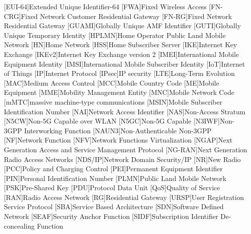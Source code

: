 \begin{multicols}{2}
\begin{acronym}[AAAAAA]
        [EUI-64]{Extended Unique Identifier-64}
        [FWA]{Fixed Wireless Access}
        [FN-CRG]{Fixed Network Customer Residential Gateway}
        [FN-RG]{Fixed Network Residential Gateway}
        [GUAMI]{Globally Unique AMF Identifier}
        [GUTI]{Globally Unique Temporary Identity}
        [HPLMN]{Home Operator Public Land Mobile Network}
        [HN]{Home Network}
        [HSS]{Home Subscriber Server}
        [IKE]{Internet Key Exchange}
        [IKEv2]{Internet Key Exchange version 2}
        [IMEI]{International Mobile Equipment Identity}
        [IMSI]{International Mobile Subscriber Identity}
        [IoT]{Internet of Things}
        [IP]{Internet Protocol}
        [IPsec]{IP security}
        [LTE]{Long-Term Evolution}
        [MAC]{Medium Access Control}
        [MCC]{Mobile Country Code}
        [ME]{Mobile Equipment}
        [MME]{Mobility Management Entity}
        [MNC]{Mobile Network Code}
        [mMTC]{massive machine-type communications}
        [MSIN]{Mobile Subscriber Identification Number}
        [NAI]{Network Access Identifier}
        [NAS]{Non-Access Stratum}
        [N5CW]{Non-5G Capable over WLAN}
        [N5GC]{Non-5G Capable}
        [N3IWF]{Non-3GPP Interworking Function}
        [NAUN3]{Non-Authenticable Non-3GPP}
        [NF]{Network Function}
        [NFV]{Network Functions Virtualization}
        [NGAP]{Next Generation Access and Service Management Protocol}
        [NG-RAN]{Next Generation Radio Access Networks}
        [NDS/IP]{Network Domain Security/IP}
        [NR]{New Radio}
        [PCC]{Policy and Charging Control}
        [PEI]{Permanent Equipment Identifier}
        [PIN]{Personal Identification Number}
        [PLMN]{Public Land Mobile Network}
        [PSK]{Pre-Shared Key}
        [PDU]{Protocol Data Unit}
        [QoS]{Quality of Service}
        [RAN]{Radio Access Network}
        [RG]{Residential Gateway}
        [URSP]{User Registration Service Protocol}
        [SBA]{Service Based Architecture}
        [SDN]{Software Defined Network}
        [SEAF]{Security Anchor Function}
        [SIDF]{Subscription Identifier De-concealing Function}

\end{acronym}
\end{multicols}
